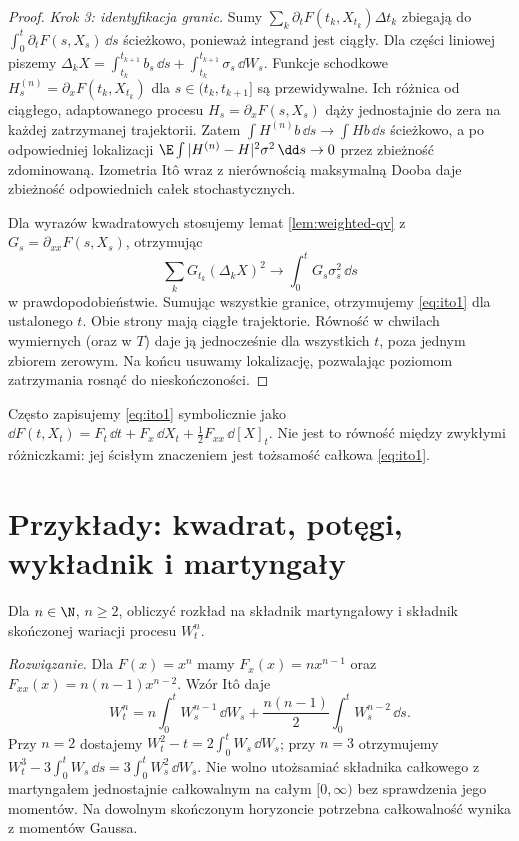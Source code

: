 \begin{proof}
\emph{Krok 3: identyfikacja granic.} Sumy
$\sum_k\partial_tF(t_k,X_{t_k})\Delta t_k$
zbiegają do $\int_0^t\partial_tF(s,X_s)\,\dd s$
ścieżkowo, ponieważ integrand jest ciągły.
Dla części liniowej piszemy
$\Delta_kX=\int_{t_k}^{t_{k+1}}b_s\,\dd s
+\int_{t_k}^{t_{k+1}}\sigma_s\,\dd W_s$.
Funkcje schodkowe
$H_s^{(n)}=\partial_xF(t_k,X_{t_k})$ dla
$s\in(t_k,t_{k+1}]$ są przewidywalne. Ich różnica
od ciągłego, adaptowanego procesu
$H_s=\partial_xF(s,X_s)$ dąży jednostajnie do zera
na każdej zatrzymanej trajektorii. Zatem
$\int H^{(n)}b\,\dd s\to\int Hb\,\dd s$
ścieżkowo, a po odpowiedniej lokalizacji
$\E\int|H^{(n)}-H|^2\sigma^2\,\dd s\to0$ przez
zbieżność zdominowaną. Izometria Itô wraz z
nierównością maksymalną Dooba daje zbieżność
odpowiednich całek stochastycznych.

Dla wyrazów kwadratowych stosujemy lemat
\ref{lem:weighted-qv} z
$G_s=\partial_{xx}F(s,X_s)$, otrzymując
\[
\sum_kG_{t_k}(\Delta_kX)^2
\longrightarrow\int_0^tG_s\sigma_s^2\,\dd s
\]
w prawdopodobieństwie. Sumując wszystkie granice,
otrzymujemy \eqref{eq:ito1} dla ustalonego $t$.
Obie strony mają ciągłe trajektorie. Równość w chwilach
wymiernych (oraz w $T$) daje ją jednocześnie dla wszystkich
$t$, poza jednym zbiorem zerowym. Na końcu usuwamy
lokalizację, pozwalając poziomom zatrzymania rosnąć do nieskończoności.
\end{proof}

\begin{uwaga}
Często zapisujemy \eqref{eq:ito1} symbolicznie jako
$\dd F(t,X_t)=F_t\,\dd t+F_x\,\dd X_t
+\frac12F_{xx}\,\dd[X]_t$. Nie jest to równość
między zwykłymi różniczkami: jej ścisłym znaczeniem
jest tożsamość całkowa \eqref{eq:ito1}.
\end{uwaga}

\section{Przykłady: kwadrat, potęgi, wykładnik i martyngały}
\begin{zadanie}
Dla $n\in\N$, $n\ge2$, obliczyć rozkład na składnik
martyngałowy i składnik skończonej wariacji procesu $W_t^n$.

\emph{Rozwiązanie.} Dla $F(x)=x^n$ mamy
$F_x(x)=nx^{n-1}$ oraz $F_{xx}(x)=n(n-1)x^{n-2}$.
Wzór Itô daje
\[
W_t^n=n\int_0^tW_s^{n-1}\,\dd W_s
+\frac{n(n-1)}2\int_0^tW_s^{n-2}\,\dd s.
\]
Przy $n=2$ dostajemy $W_t^2-t=2\int_0^tW_s\,\dd W_s$;
przy $n=3$ otrzymujemy $W_t^3-3\int_0^tW_s\,\dd s
=3\int_0^tW_s^2\,\dd W_s$. Nie wolno utożsamiać
składnika całkowego z martyngałem jednostajnie
całkowalnym na całym $[0,\infty)$ bez sprawdzenia
jego momentów. Na dowolnym skończonym horyzoncie
potrzebna całkowalność wynika z momentów Gaussa.
\end{zadanie}

